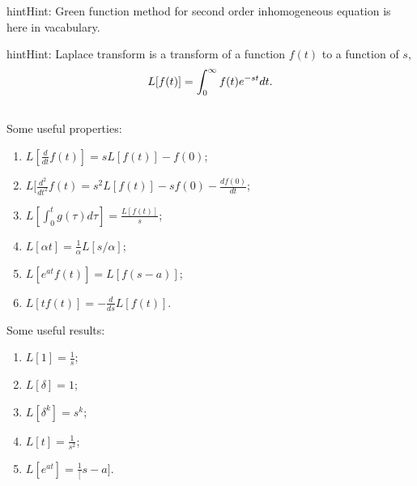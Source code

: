 \documentclass[letterpaper,10pt,english]{sphinxmanual}
\begin{document}
\begin{notice}{hint}{Hint:}
Green function method for second order inhomogeneous equation is here in vacabulary.
\end{notice}

\begin{notice}{hint}{Hint:}
Laplace transform is a transform of a function $f(t)$ to a function of $s$,
\begin{gather}
\begin{split}L[f(t)] = \int_0^\infty f(t) e^{ - s t} dt .\end{split}\notag\\\begin{split}\end{split}\notag
\end{gather}
Some useful properties:
\begin{enumerate}
\item {} 
$L[\frac{d}{dt}f(t)] = s L[f(t)] - f(0)$;

\item {} 
$L[\frac{d^2}{dt^2}f(t) = s^2 L[f(t)] - s f(0) - \frac{d f(0)}{dt}$;

\item {} 
$L[\int_0^t g(\tau) d\tau ] = \frac{L[f(t)]}{s}$;

\item {} 
$L[\alpha t] = \frac{1}{\alpha} L[s/\alpha]$;

\item {} 
$L[e^{at}f(t)] = L[f(s-a)]$;

\item {} 
$L[tf(t)] = - \frac{d}{ds} L[f(t)]$.

\end{enumerate}

Some useful results:
\begin{enumerate}
\item {} 
$L[1] = \frac{1}{s}$;

\item {} 
$L[\delta] = 1$;

\item {} 
$L[\delta^k] = s^k$;

\item {} 
$L[t] = \frac{1}{s^2}$;

\item {} 
$L[e^{at}]= \frac{1}[s-a]$.

\end{enumerate}
\end{notice}
\end{document}
